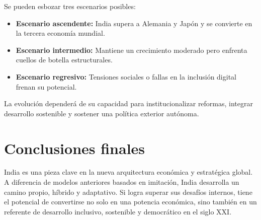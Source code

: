 \documentclass[12pt]{article}
\begin{document}
Se pueden esbozar tres escenarios posibles:

\begin{itemize}
  \item \textbf{Escenario ascendente:} India supera a Alemania y Japón y se convierte en la tercera economía mundial.
  \item \textbf{Escenario intermedio:} Mantiene un crecimiento moderado pero enfrenta cuellos de botella estructurales.
  \item \textbf{Escenario regresivo:} Tensiones sociales o fallas en la inclusión digital frenan su potencial.
\end{itemize}

La evolución dependerá de su capacidad para institucionalizar reformas, integrar desarrollo sostenible y sostener una política exterior autónoma.

\section*{Conclusiones finales}

India es una pieza clave en la nueva arquitectura económica y estratégica global. A diferencia de modelos anteriores basados en imitación, India desarrolla un camino propio, híbrido y adaptativo. Si logra superar sus desafíos internos, tiene el potencial de convertirse no solo en una potencia económica, sino también en un referente de desarrollo inclusivo, sostenible y democrático en el siglo XXI.
\end{document}
